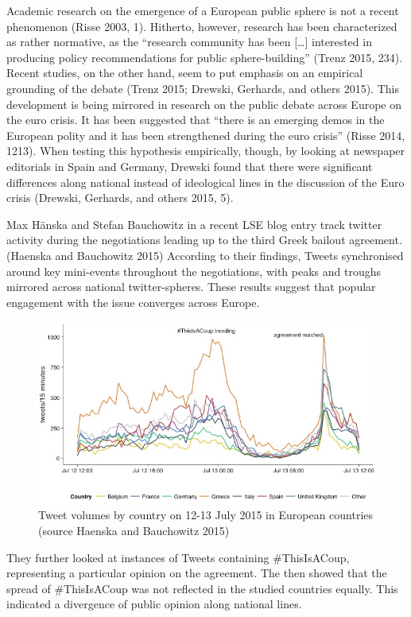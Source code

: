 \documentclass[]{article}
\begin{document}
Academic research on the emergence of a European public sphere is not a
recent phenomenon (Risse 2003, 1). Hitherto, however, research has been
characterized as rather normative, as the ``research community has been
{[}\ldots{}{]} interested in producing policy recommendations for public
sphere-building'' (Trenz 2015, 234). Recent studies, on the other hand,
seem to put emphasis on an empirical grounding of the debate (Trenz
2015; Drewski, Gerhards, and others 2015). This development is being
mirrored in research on the public debate across Europe on the euro
crisis. It has been suggested that ``there is an emerging demos in the
European polity and it has been strengthened during the euro crisis''
(Risse 2014, 1213). When testing this hypothesis empirically, though, by
looking at newspaper editorials in Spain and Germany, Drewski found that
there were significant differences along national instead of ideological
lines in the discussion of the Euro crisis (Drewski, Gerhards, and
others 2015, 5).

Max Hänska and Stefan Bauchowitz in a recent LSE blog entry track
twitter activity during the negotiations leading up to the third Greek
bailout agreement. (Haenska and Bauchowitz 2015) According to their
findings, Tweets synchronised around key mini-events throughout the
negotiations, with peaks and troughs mirrored across national
twitter-spheres. These results suggest that popular engagement with the
issue converges across Europe.

\begin{figure}[htbp]
\centering
\includegraphics{img/Greece-twitter-1.jpg}
\caption{Tweet volumes by country on 12-13 July 2015 in European
countries (source Haenska and Bauchowitz 2015)}
\end{figure}

They further looked at instances of Tweets containing \#ThisIsACoup,
representing a particular opinion on the agreement. The then showed that
the spread of \#ThisIsACoup was not reflected in the studied countries
equally. This indicated a divergence of public opinion along national
lines.
\end{document}

